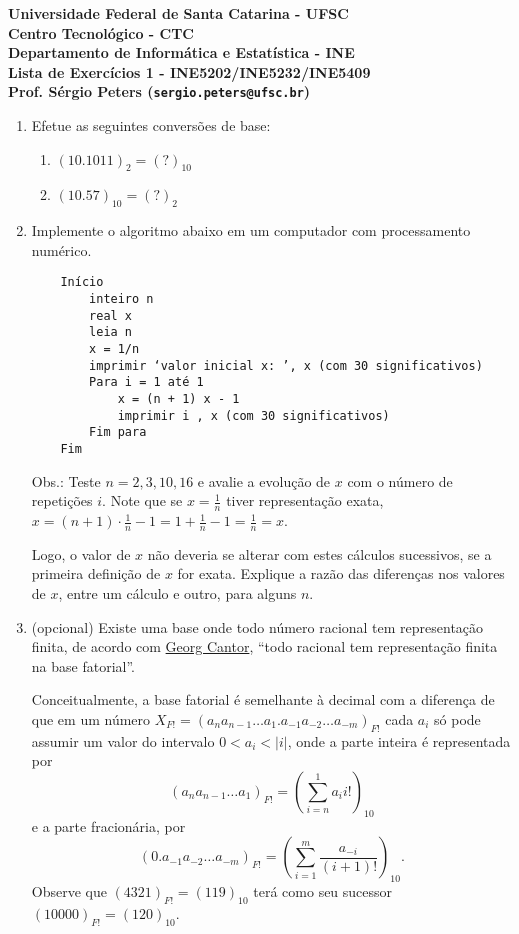 \documentclass[12pt]{article}
\newenvironment{smallitem}{
    \vspace{-2mm}
    \begin{enumerate}
    \setlength{\parskip}{0pt}
    \setlength{\itemsep}{2pt}
}{
    \vspace{-2mm}
    \end{enumerate}
}
\begin{document}
{\bf \noindent Universidade Federal de Santa Catarina - UFSC \\
Centro Tecnológico - CTC \\
Departamento de Informática e Estatística - INE \\

\noindent Lista de Exercícios 1 - INE5202/INE5232/INE5409 \\
Prof. Sérgio Peters (\texttt{sergio.peters@ufsc.br})}

\begin{enumerate}[label=\textbf{\arabic*})]

\item Efetue as seguintes conversões de base:

\begin{smallitem}

\item $(10.1011)_2 = (?)_{10}$

\item $(10.57)_{10} = (?)_2$

\end{smallitem}

\item Implemente o algoritmo abaixo em um computador com processamento
numérico.
\begin{verbatim}
    Início
        inteiro n
        real x
        leia n
        x = 1/n
        imprimir ‘valor inicial x: ’, x (com 30 significativos)
        Para i = 1 até 1
            x = (n + 1) x - 1
            imprimir i , x (com 30 significativos)
        Fim para
    Fim\end{verbatim}
Obs.: Teste $n = 2, 3, 10, 16$ e avalie a evolução de $x$ com o número de
repetições $i$.  Note que se $x = \frac{1}{n}$ tiver representação exata,
$x = (n + 1) \cdot \frac{1}{n} - 1 = 1 + \frac{1}{n} - 1 = \frac{1}{n} = x$.

Logo, o valor de $x$ não deveria se alterar com estes cálculos sucessivos, se a
primeira definição de $x$ for exata. Explique a razão das diferenças nos valores
de $x$, entre um cálculo e outro, para alguns $n$.

\item (opcional) Existe uma base onde todo número racional tem representação
finita, de acordo com
\href{https://en.wikipedia.org/wiki/Georg_Cantor}{Georg Cantor}, “todo racional
tem representação finita na base fatorial”.

Conceitualmente, a base fatorial é semelhante à decimal com a diferença de que
em um número $X_{F!} = (a_n a_{n-1} \dots a_1.a_{-1} a_{-2} \dots a_{-m})_{F!}$
cada $a_i$ só pode assumir um valor do intervalo $0 < a_i < \lvert i \rvert$,
onde a parte inteira é representada por
\begin{equation*}
(a_n a_{n-1} \dots a_1)_{F!} = \left( \sum_{i=n}^1 a_i i! \right)_{10}
\end{equation*}
e a parte fracionária, por
\begin{equation*}
(0.a_{-1} a_{-2} \dots a_{-m})_{F!} = \left( \sum_{i=1}^m
\frac{a_{-i}}{(i+1)!} \right)_{10}.
\end{equation*}
Observe que $(4321)_{F!} = (119)_{10}$ terá como seu sucessor $(10000)_{F!} =
(120)_{10}$.


\end{enumerate}
\end{document}
